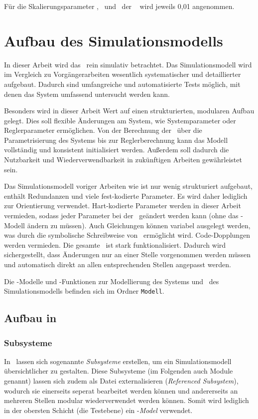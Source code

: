 Für die Skalierungsparameter \xopth, \pheth\ und \phzth\ der \crb\  wird jeweils 0,01 angenommen.



\section{Aufbau des Simulationsmodells}

In dieser Arbeit wird das \dpds\ rein simulativ betrachtet.
Das Simulationsmodell wird im Vergleich zu Vorgängerarbeiten wesentlich systematischer und detaillierter aufgebaut.
Dadurch sind umfangreiche und automatisierte Tests möglich, mit denen das System umfassend untersucht werden kann.

Besonders wird in dieser Arbeit Wert auf einen strukturierten, modularen Aufbau gelegt.
Dies soll flexible Änderungen am System, wie \zB Systemparameter oder Reglerparameter ermöglichen.
Von der Berechnung der \bwgl\ über die Parametrisierung des Systems bis zur Reglerberechnung kann das Modell vollständig und konsistent initialisiert werden.
Außerdem soll dadurch die Nutzbarkeit und Wiederverwendbarkeit in zukünftigen Arbeiten gewährleistet sein.

Das Simulationsmodell voriger Arbeiten wie \cite{chang} ist nur wenig strukturiert aufgebaut, enthält Redundanzen und viele fest-kodierte Parameter.
Es wird daher lediglich zur Orientierung verwendet.
Hart-kodierte Parameter werden in dieser Arbeit vermieden, sodass jeder Parameter bei der \init\ geändert werden kann (ohne das \sm-Modell ändern zu müssen).
Auch Gleichungen können variabel ausgelegt werden, was durch die symbolische Schreibweise von \ml\ ermöglicht wird.
Code-Dopplungen werden vermieden. 
Die gesamte \init\ ist stark funktionalisiert.
Dadurch wird sichergestellt, dass Änderungen nur an einer Stelle vorgenommen werden müssen und automatisch direkt an allen entsprechenden Stellen angepasst werden.

Die \sm-Modelle und \ml-Funktionen zur Modellierung des Systems und \init\ des Simulationsmodells befinden sich im Ordner \texttt{Modell}. 


\subsection{Aufbau in \Simulink}

\subsubsection{Subsysteme}
In \sm\ lassen sich sogenannte \emph{Subsysteme} erstellen, um ein Simulationsmodell übersichtlicher zu gestalten.
Diese Subsysteme (im Folgenden auch Module genannt) lassen sich zudem als Datei externalisieren (\emph{Referenced Subsystem}), wodurch sie einerseits seperat bearbeitet werden können und andererseits an mehreren Stellen modular wiederverwendet werden können.
Somit wird lediglich in der obersten Schicht (die Testebene) ein \sm-\emph{Model} verwendet.

